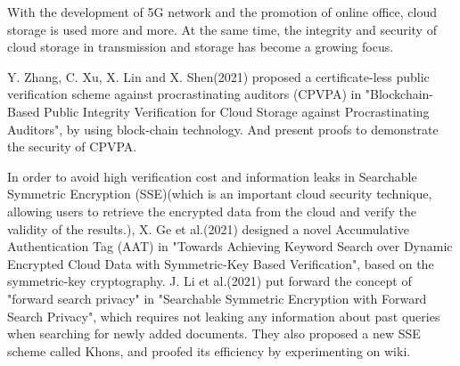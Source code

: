 \documentclass{article}
\begin{document}
With the development of 5G network and the promotion of online office, cloud storage is used more and more. At the same time, the integrity and security of cloud storage in transmission and storage has become a growing focus.

Y. Zhang, C. Xu, X. Lin and X. Shen(2021) proposed a certificate-less public verification scheme against procrastinating auditors (CPVPA) in "Blockchain-Based Public Integrity Verification for Cloud Storage against Procrastinating Auditors"\cite{LPH-1}, by using block-chain technology. And present proofs to demonstrate the security of CPVPA.

In order to avoid high verification cost and information leaks in Searchable Symmetric Encryption (SSE)(which is an important cloud security technique, allowing users to retrieve the encrypted data from the cloud and verify the validity of the results.), X. Ge et al.(2021) designed a novel Accumulative Authentication Tag (AAT) in "Towards Achieving Keyword Search over Dynamic Encrypted Cloud Data with Symmetric-Key Based Verification"\cite{LPH-2}, based on the symmetric-key cryptography. J. Li et al.(2021) put forward the concept of "forward search privacy" in "Searchable Symmetric Encryption with Forward Search Privacy"\cite{LPH-3}, which requires not leaking any information about past queries when searching for newly added documents. They also proposed a new SSE scheme called Khons, and proofed its efficiency by experimenting on wiki.

\printbibliography %
\end{document}
